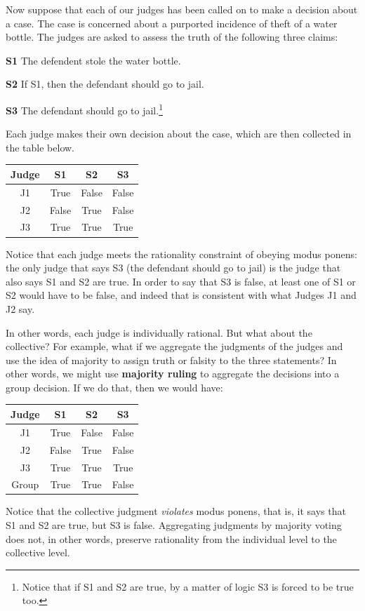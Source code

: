 \documentclass[]{tufte-book}
\begin{document}
Now suppose that each of our judges has been called on to make a decision about a case. The case is concerned about a purported incidence of theft of a water bottle. The judges are asked to assess the truth of the following three claims:

\textbf{S1} The defendent stole the water bottle.

\textbf{S2} If S1, then the defendant should go to jail.

\textbf{S3} The defendant should go to jail.\footnote{Notice that if S1 and S2 are true, by a matter of logic S3 is forced to be true too.}

Each judge makes their own decision about the case, which are then collected in the table below.

\begin{longtable}[]{@{}cccc@{}}
\toprule
Judge & S1 & S2 & S3\tabularnewline
\midrule
\endhead
J1 & True & False & False\tabularnewline
J2 & False & True & False\tabularnewline
J3 & True & True & True\tabularnewline
\bottomrule
\end{longtable}

Notice that each judge meets the rationality constraint of obeying modus ponens: the only judge that says S3 (the defendant should go to jail) is the judge that also says S1 and S2 are true. In order to say that S3 is false, at least one of S1 or S2 would have to be false, and indeed that is consistent with what Judges J1 and J2 say.

In other words, each judge is individually rational. But what about the collective? For example, what if we aggregate the judgments of the judges and use the idea of majority to assign truth or falsity to the three statements? In other words, we might use \textbf{majority ruling} to aggregate the decisions into a group decision. If we do that, then we would have:

\begin{longtable}[]{@{}cccc@{}}
\toprule
Judge & S1 & S2 & S3\tabularnewline
\midrule
\endhead
J1 & True & False & False\tabularnewline
J2 & False & True & False\tabularnewline
J3 & True & True & True\tabularnewline
Group & True & True & False\tabularnewline
\bottomrule
\end{longtable}

Notice that the collective judgment \emph{violates} modus ponens, that is, it says that S1 and S2 are true, but S3 is false. Aggregating judgments by majority voting does not, in other words, preserve rationality from the individual level to the collective level.
\end{document}
